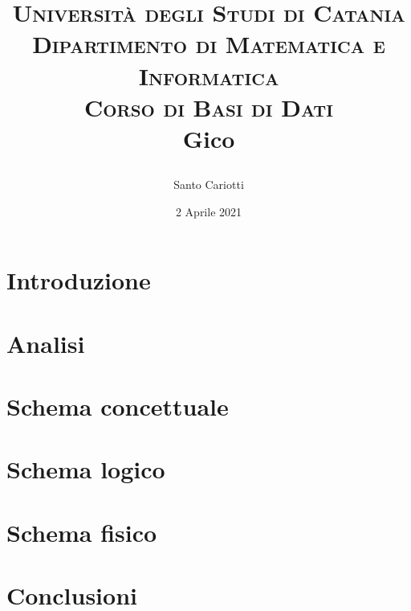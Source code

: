 

\title{
    \small\textsc{Università degli Studi di Catania\\Dipartimento di Matematica e Informatica\\Corso di Basi di Dati}\\
    \Huge\textbf{Gico}\\
    \author{Santo Cariotti}
    \date{2 Aprile 2021}
}

\usepackage{graphicx}

\maketitle

\renewcommand{\contentsname}{Indice}
\tableofcontents{}


\chapter{Introduzione}


\chapter{Analisi}


\chapter{Schema concettuale}


\chapter{Schema logico}


\chapter{Schema fisico}


\chapter{Conclusioni}



